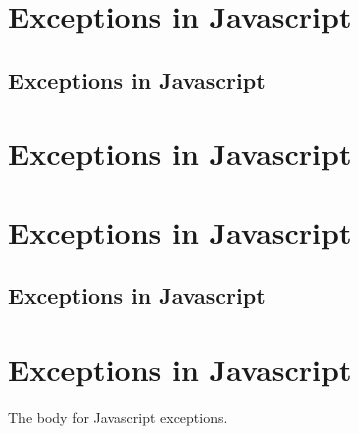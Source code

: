 %
%
%

\ifdefined\CntLIHeadingHeadingType
\else
    \newcommand{\CntLIHeadingHeadingType}[1]{
        \ifdefined\CntLIHeadingSection
            \section{#1}
        \else
            \ifdefined\CntLIHeadingSubSection
                \subsection{#1}
            \else
                \section{#1}
            \fi
        \fi
    }
\fi

\newcommand{\CntLIHeadingJavascriptExceptionsText}{\CntLIHeadingHeadingType{Exceptions in Javascript}\label{sec:javascript-exceptions-1.0.0}}

\ifdefined\CntLIHeading
    \CntLIHeadingJavascriptExceptionsText
\else
    \ifdefined\CntLIHeadingJavascriptExceptionsVIvOvO
        \CntLIHeadingJavascriptExceptionsText
    \fi
\fi

The body for Javascript exceptions.
